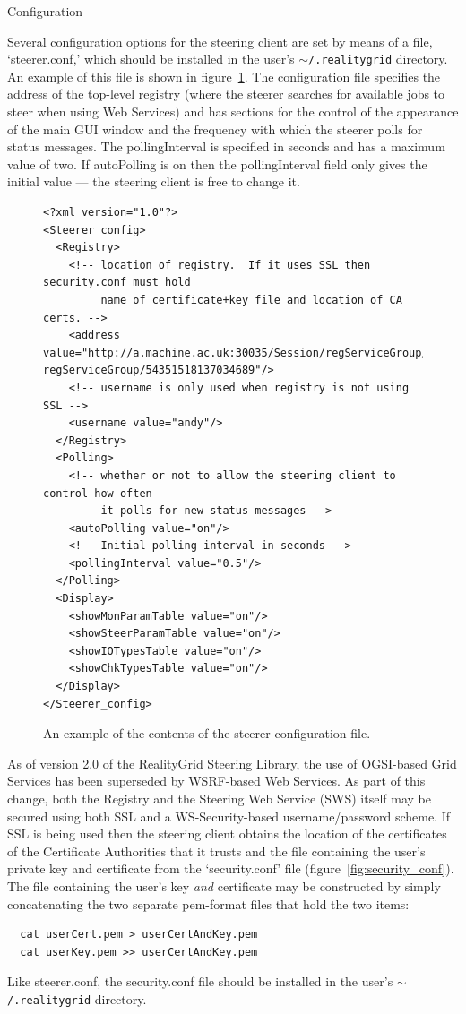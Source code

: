 \documentclass[a4paper,twoside]{article}
\begin{document}
\begin{section}{Configuration}
\label{sec:config}

Several configuration options for the steering client are set by means
of a file, `steerer.conf,' which should be installed in the user's
\texttt{$\sim$/.realitygrid} directory. An example of this file is
shown in figure~\ref{fig:steerer_conf}.  The configuration file
specifies the address of the top-level registry (where the steerer
searches for available jobs to steer when using Web Services) and has
sections for the control of the appearance of the main GUI window and
the frequency with which the steerer polls for status messages.  The
pollingInterval is specified in seconds and has a maximum value of
two. If autoPolling is on then the pollingInterval field only gives
the initial value --- the steering client is free to change it.

\begin{figure}[h]
\begin{verbatim}<?xml version="1.0"?>
<Steerer_config>
  <Registry>
    <!-- location of registry.  If it uses SSL then security.conf must hold
         name of certificate+key file and location of CA certs. -->
    <address value="http://a.machine.ac.uk:30035/Session/regServiceGroup/
regServiceGroup/54351518137034689"/>
    <!-- username is only used when registry is not using SSL -->
    <username value="andy"/>
  </Registry>
  <Polling>
    <!-- whether or not to allow the steering client to control how often
         it polls for new status messages -->
    <autoPolling value="on"/>
    <!-- Initial polling interval in seconds -->
    <pollingInterval value="0.5"/>
  </Polling>
  <Display>
    <showMonParamTable value="on"/>
    <showSteerParamTable value="on"/>
    <showIOTypesTable value="on"/>
    <showChkTypesTable value="on"/>
  </Display>
</Steerer_config>
\end{verbatim}
\caption{An example of the contents of the steerer configuration file.}
\label{fig:steerer_conf}
\end{figure}

As of version 2.0 of the RealityGrid Steering Library, the use of
OGSI-based Grid Services has been superseded by WSRF-based Web
Services.  As part of this change, both the Registry and the Steering
Web Service (SWS) itself may be secured using both SSL and a
WS-Security-based username/password scheme. If SSL is being used then
the steering client obtains the location of the certificates of the
Certificate Authorities that it trusts and the file containing the
user's private key and certificate from the `security.conf' file
(figure~\ref{fig:security_conf}). The file containing the user's key
{\em and} certificate may be constructed by simply concatenating the
two separate pem-format files that hold the two items:
\begin{verbatim}
  cat userCert.pem > userCertAndKey.pem
  cat userKey.pem >> userCertAndKey.pem
\end{verbatim}
Like steerer.conf, the security.conf file should be installed in the user's
\texttt{$\sim$/.realitygrid} directory.


\end{section}
\end{document}
